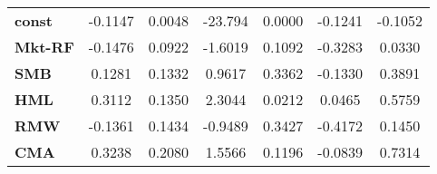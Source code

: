 \begin{center}
\begin{tabular}{lcccccc}
\midrule
\textbf{const}  &      -0.1147       &       0.0048       &     -23.794     &      0.0000      &      -0.1241      &      -0.1052       \\
\textbf{Mkt-RF} &      -0.1476       &       0.0922       &     -1.6019     &      0.1092      &      -0.3283      &       0.0330       \\
\textbf{SMB}    &       0.1281       &       0.1332       &      0.9617     &      0.3362      &      -0.1330      &       0.3891       \\
\textbf{HML}    &       0.3112       &       0.1350       &      2.3044     &      0.0212      &       0.0465      &       0.5759       \\
\textbf{RMW}    &      -0.1361       &       0.1434       &     -0.9489     &      0.3427      &      -0.4172      &       0.1450       \\
\textbf{CMA}    &       0.3238       &       0.2080       &      1.5566     &      0.1196      &      -0.0839      &       0.7314       \\
\bottomrule
\end{tabular}
\end{center}
